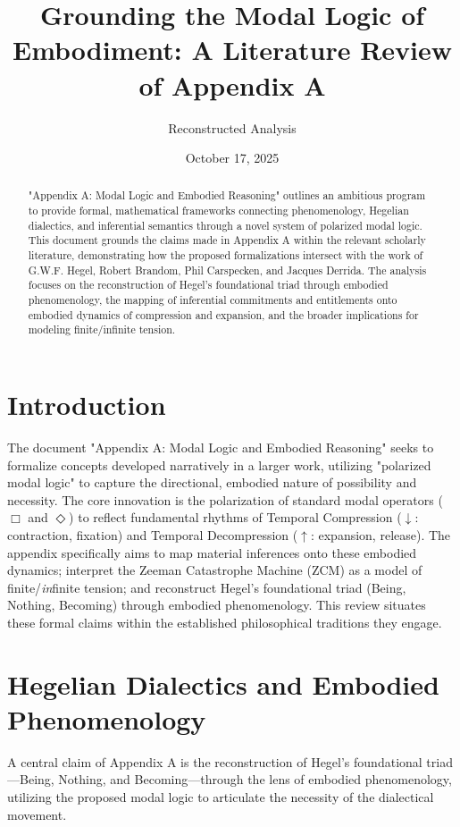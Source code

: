 \documentclass[12pt]{article}
\title{Grounding the Modal Logic of Embodiment: A Literature Review of Appendix A}
\author{Reconstructed Analysis}
\date{October 17, 2025}
\begin{document}
\maketitle

\begin{abstract}
"Appendix A: Modal Logic and Embodied Reasoning" outlines an ambitious program to provide formal, mathematical frameworks connecting phenomenology, Hegelian dialectics, and inferential semantics through a novel system of polarized modal logic. This document grounds the claims made in Appendix A within the relevant scholarly literature, demonstrating how the proposed formalizations intersect with the work of G.W.F. Hegel, Robert Brandom, Phil Carspecken, and Jacques Derrida. The analysis focuses on the reconstruction of Hegel's foundational triad through embodied phenomenology, the mapping of inferential commitments and entitlements onto embodied dynamics of compression and expansion, and the broader implications for modeling finite/infinite tension.
\end{abstract}

\section{Introduction}

The document "Appendix A: Modal Logic and Embodied Reasoning" seeks to formalize concepts developed narratively in a larger work, utilizing "polarized modal logic" to capture the directional, embodied nature of possibility and necessity. The core innovation is the polarization of standard modal operators ($\Box$ and $\Diamond$) to reflect fundamental rhythms of Temporal Compression ($\downarrow$: contraction, fixation) and Temporal Decompression ($\uparrow$: expansion, release). The appendix specifically aims to map material inferences onto these embodied dynamics; interpret the Zeeman Catastrophe Machine (ZCM) as a model of finite/\textit{in}finite tension; and reconstruct Hegel's foundational triad (Being, Nothing, Becoming) through embodied phenomenology. This review situates these formal claims within the established philosophical traditions they engage.

\section{Hegelian Dialectics and Embodied Phenomenology}

A central claim of Appendix A is the reconstruction of Hegel's foundational triad—Being, Nothing, and Becoming—through the lens of embodied phenomenology, utilizing the proposed modal logic to articulate the necessity of the dialectical movement.
\end{document}
